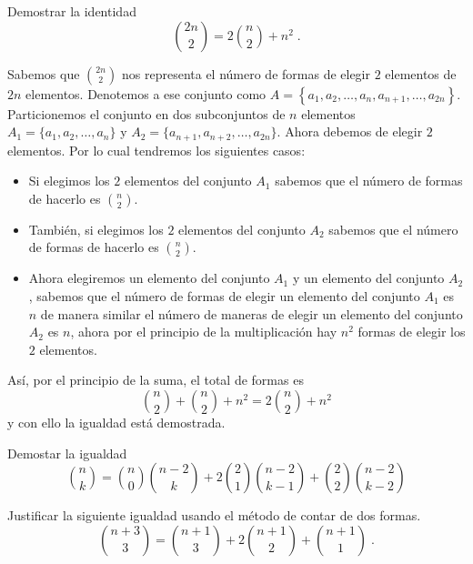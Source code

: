 \begin{ejemplo}
Demostrar la identidad
\[\binom{2n}{2}=2\binom{n}{2}+n^2\;.\]
\end{ejemplo}

\begin{solucion}
Sabemos que $\displaystyle \binom{2n}{2}$ nos representa el número de formas de elegir $2$ elementos de $2n$ elementos. Denotemos a ese conjunto como $\displaystyle A=\left\{a_1,a_2,\ldots,a_n,a_{n+1},\ldots,a_{2n}\right\}$. Particionemos el conjunto en dos subconjuntos de $n$ elementos $A_1=\{a_1,a_2,\ldots,a_n\}$ y $A_2=\{a_{n+1},a_{n+2},\ldots,a_{2n}\}$.
Ahora debemos de elegir $2$ elementos. Por lo cual tendremos los siguientes casos:
\begin{itemize}
    \item Si elegimos los $2$ elementos del conjunto $A_1$ sabemos que el número de formas de hacerlo es $\displaystyle \binom{n}{2}$.
    \item También, si elegimos los $2$ elementos del conjunto $A_2$ sabemos que el número de formas de hacerlo es $\displaystyle \binom{n}{2}$.
    \item  Ahora elegiremos un elemento del conjunto $A_1$ y un elemento del conjunto $A_2$, sabemos que el número de formas de elegir un elemento del conjunto $A_1$ es $n$ de manera similar el número de maneras de elegir un elemento del conjunto $A_2$ es $n$, ahora por el principio de la multiplicación hay $n^2$ formas de elegir los $2$ elementos. 
\end{itemize}
Así, por el principio de la suma, el total de formas es
\[\binom{n}{2}+\binom{n}{2}+n^2=2\binom{n}{2}+n^2\]
y con ello la igualdad está demostrada.
\end{solucion}

\begin{tcolorbox}[colback=black!5!white,colframe=black!75!black,title=Ejercicio]
Demostar la igualdad
   \[\binom{n}{k}=\binom{n}{0}\binom{n-2}{k}+2\binom{2}{1}\binom{n-2}{k-1}+\binom{2}{2}\binom{n-2}{k-2}\]
  \vspace{10cm}
\end{tcolorbox}
\begin{ejemplo}
    Justificar la siguiente igualdad usando el método de contar de dos formas.
    \[\binom{n+3}{3}=\binom{n+1}{3}+2\binom{n+1}{2}+\binom{n+1}{1}\;.\]
\end{ejemplo}

